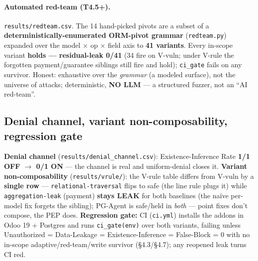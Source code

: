 \documentclass[runningheads]{llncs}
\newcommand{\code}[1]{\texttt{#1}}
\begin{document}
\paragraph{Automated red-team (T4.5+).} \code{results/redteam.csv}. The 14 hand-picked pivots are a subset of a
\textbf{deterministically-enumerated ORM-pivot grammar} (\code{redteam.py}) expanded over the model $\times$ op
$\times$ field axis to \textbf{41 variants}. Every in-scope variant \textbf{holds --- residual-leak 0/41} (34
fire on V-vuln; under V-rule the forgotten payment/guarantee siblings still fire and hold); \code{ci_gate} fails
on any survivor. Honest: exhaustive over the \emph{grammar} (a modeled surface), not the universe of attacks;
deterministic, \textbf{NO LLM} --- a structured fuzzer, not an ``AI red-team''.

\subsection{Denial channel, variant non-composability, regression gate}
\textbf{Denial channel} (\code{results/denial_channel.csv}): Existence-Inference Rate \textbf{1/1 OFF $\to$ 0/1 ON}
--- the channel is real and uniform-denial closes it. \textbf{Variant non-composability} (\code{results/vrule/}):
the V-rule table differs from V-vuln by a \textbf{single row} --- \code{relational-traversal} flips to safe (the
line rule plugs it) while \code{aggregation-leak} (payment) \textbf{stays LEAK} for both baselines (the na\"ive
per-model fix forgets the sibling); PG-Agent is safe/held in \emph{both} --- point fixes don't compose, the PEP
does. \textbf{Regression gate:} CI (\code{ci.yml}) installs the addons in Odoo 19 + Postgres and runs
\code{ci_gate(env)} over both variants, failing unless Unauthorized = Data-Leakage = Existence-Inference =
False-Block = 0 with no in-scope adaptive/red-team/write survivor (\S4.3/\S4.7); any reopened leak turns CI red.
\end{document}
